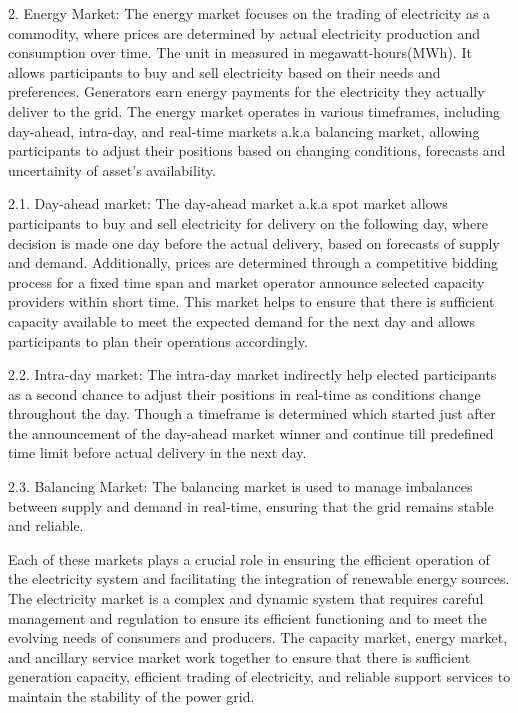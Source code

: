 2. Energy Market: The energy market focuses on the trading of electricity as a commodity, where prices are determined by actual electricity production and consumption over time. The unit in measured in megawatt-hours(MWh). It allows participants to buy and sell electricity based on their needs and preferences. Generators earn energy payments for the electricity they actually deliver to the grid. The energy market operates in various timeframes, including day-ahead, intra-day, and real-time markets a.k.a balancing market, allowing participants to adjust their positions based on changing conditions, forecasts and uncertainity of asset's availability.

        2.1. Day-ahead market: The day-ahead market a.k.a spot market allows participants to buy and sell electricity for delivery on the following day, where decision is made one day before the actual delivery, based on forecasts of supply and demand. Additionally, prices are determined through a competitive bidding process for a fixed time span and market operator announce selected capacity providers within short time. This market helps to ensure that there is sufficient capacity available to meet the expected demand for the next day and allows participants to plan their operations accordingly.
    
        2.2. Intra-day market: The intra-day market indirectly help elected participants as a second chance to adjust their positions in real-time as conditions change throughout the day. Though a timeframe is determined which started just after the announcement of the day-ahead market winner and continue till predefined time limit before actual delivery in the next day. 
    
        2.3. Balancing Market: The balancing market is used to manage imbalances between supply and demand in real-time, ensuring that the grid remains stable and reliable. 

        Each of these markets plays a crucial role in ensuring the efficient operation of the electricity system and facilitating the integration of renewable energy sources. The electricity market is a complex and dynamic system that requires careful management and regulation to ensure its efficient functioning and to meet the evolving needs of consumers and producers. The capacity market, energy market, and ancillary service market work together to ensure that there is sufficient generation capacity, efficient trading of electricity, and reliable support services to maintain the stability of the power grid.


